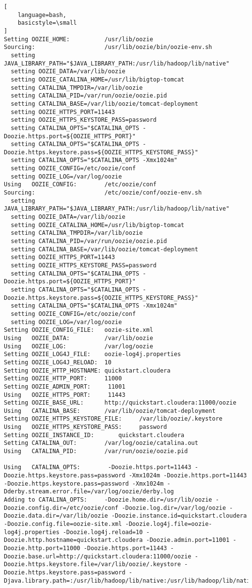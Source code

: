 \documentclass[a4paper]{article}
\begin{document}
\begin{lstlisting}[
    language=bash,
    basicstyle=\small
]
Setting OOZIE_HOME:          /usr/lib/oozie
Sourcing:                    /usr/lib/oozie/bin/oozie-env.sh
  setting JAVA_LIBRARY_PATH="$JAVA_LIBRARY_PATH:/usr/lib/hadoop/lib/native"
  setting OOZIE_DATA=/var/lib/oozie
  setting OOZIE_CATALINA_HOME=/usr/lib/bigtop-tomcat
  setting CATALINA_TMPDIR=/var/lib/oozie
  setting CATALINA_PID=/var/run/oozie/oozie.pid
  setting CATALINA_BASE=/var/lib/oozie/tomcat-deployment
  setting OOZIE_HTTPS_PORT=11443
  setting OOZIE_HTTPS_KEYSTORE_PASS=password
  setting CATALINA_OPTS="$CATALINA_OPTS -Doozie.https.port=${OOZIE_HTTPS_PORT}"
  setting CATALINA_OPTS="$CATALINA_OPTS -Doozie.https.keystore.pass=${OOZIE_HTTPS_KEYSTORE_PASS}"
  setting CATALINA_OPTS="$CATALINA_OPTS -Xmx1024m"
  setting OOZIE_CONFIG=/etc/oozie/conf
  setting OOZIE_LOG=/var/log/oozie
Using   OOZIE_CONFIG:        /etc/oozie/conf
Sourcing:                    /etc/oozie/conf/oozie-env.sh
  setting JAVA_LIBRARY_PATH="$JAVA_LIBRARY_PATH:/usr/lib/hadoop/lib/native"
  setting OOZIE_DATA=/var/lib/oozie
  setting OOZIE_CATALINA_HOME=/usr/lib/bigtop-tomcat
  setting CATALINA_TMPDIR=/var/lib/oozie
  setting CATALINA_PID=/var/run/oozie/oozie.pid
  setting CATALINA_BASE=/var/lib/oozie/tomcat-deployment
  setting OOZIE_HTTPS_PORT=11443
  setting OOZIE_HTTPS_KEYSTORE_PASS=password
  setting CATALINA_OPTS="$CATALINA_OPTS -Doozie.https.port=${OOZIE_HTTPS_PORT}"
  setting CATALINA_OPTS="$CATALINA_OPTS -Doozie.https.keystore.pass=${OOZIE_HTTPS_KEYSTORE_PASS}"
  setting CATALINA_OPTS="$CATALINA_OPTS -Xmx1024m"
  setting OOZIE_CONFIG=/etc/oozie/conf
  setting OOZIE_LOG=/var/log/oozie
Setting OOZIE_CONFIG_FILE:   oozie-site.xml
Using   OOZIE_DATA:          /var/lib/oozie
Using   OOZIE_LOG:           /var/log/oozie
Setting OOZIE_LOG4J_FILE:    oozie-log4j.properties
Setting OOZIE_LOG4J_RELOAD:  10
Setting OOZIE_HTTP_HOSTNAME: quickstart.cloudera
Setting OOZIE_HTTP_PORT:     11000
Setting OOZIE_ADMIN_PORT:     11001
Using   OOZIE_HTTPS_PORT:     11443
Setting OOZIE_BASE_URL:      http://quickstart.cloudera:11000/oozie
Using   CATALINA_BASE:       /var/lib/oozie/tomcat-deployment
Setting OOZIE_HTTPS_KEYSTORE_FILE:     /var/lib/oozie/.keystore
Using   OOZIE_HTTPS_KEYSTORE_PASS:     password
Setting OOZIE_INSTANCE_ID:       quickstart.cloudera
Setting CATALINA_OUT:        /var/log/oozie/catalina.out
Using   CATALINA_PID:        /var/run/oozie/oozie.pid

Using   CATALINA_OPTS:        -Doozie.https.port=11443 -Doozie.https.keystore.pass=password -Xmx1024m -Doozie.https.port=11443 -Doozie.https.keystore.pass=password -Xmx1024m -Dderby.stream.error.file=/var/log/oozie/derby.log
Adding to CATALINA_OPTS:     -Doozie.home.dir=/usr/lib/oozie -Doozie.config.dir=/etc/oozie/conf -Doozie.log.dir=/var/log/oozie -Doozie.data.dir=/var/lib/oozie -Doozie.instance.id=quickstart.cloudera -Doozie.config.file=oozie-site.xml -Doozie.log4j.file=oozie-log4j.properties -Doozie.log4j.reload=10 -Doozie.http.hostname=quickstart.cloudera -Doozie.admin.port=11001 -Doozie.http.port=11000 -Doozie.https.port=11443 -Doozie.base.url=http://quickstart.cloudera:11000/oozie -Doozie.https.keystore.file=/var/lib/oozie/.keystore -Doozie.https.keystore.pass=password -Djava.library.path=:/usr/lib/hadoop/lib/native:/usr/lib/hadoop/lib/native


\end{lstlisting}
\end{document}
